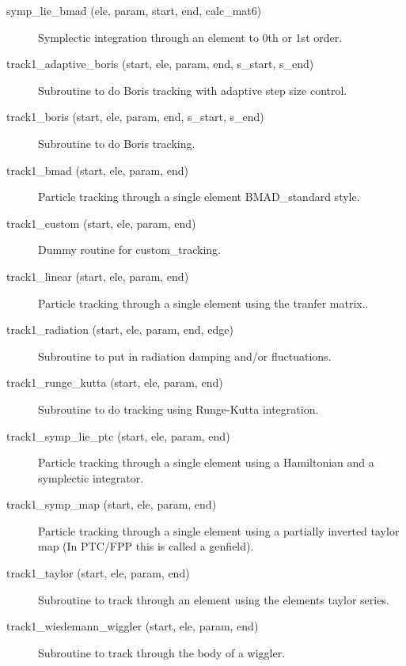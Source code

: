 \begin{description}

\item[symp\_lie\_bmad (ele, param, start, end, calc\_mat6)] \Newline
Symplectic integration through an element to 0th or 1st order.

\item[track1\_adaptive\_boris (start, ele, param, end, s\_start, s\_end)] \Newline
Subroutine to do Boris tracking with adaptive step size control. 

\item[track1\_boris (start, ele, param, end, s\_start, s\_end)] \Newline
Subroutine to do Boris tracking.  

\item[track1\_bmad (start, ele, param, end)] \Newline
Particle tracking through a single element BMAD\_standard style. 

\item[track1\_custom (start, ele, param, end)] \Newline
Dummy routine for custom\_tracking.

\item[track1\_linear (start, ele, param, end)] \Newline
Particle tracking through a single element using the tranfer matrix.. 

\item[track1\_radiation (start, ele, param, end, edge)] \Newline
Subroutine to put in radiation damping and/or fluctuations. 

\item[track1\_runge\_kutta (start, ele, param, end)] \Newline
Subroutine to do tracking using Runge-Kutta integration. 

\item[track1\_symp\_lie\_ptc (start, ele, param, end)] \Newline
Particle tracking through a single element using a Hamiltonian and a 
symplectic integrator. 

\item[track1\_symp\_map (start, ele, param, end)] \Newline
Particle tracking through a single element using a partially inverted 
taylor map (In PTC/FPP this is called a genfield). 

\item[track1\_taylor (start, ele, param, end)] \Newline
Subroutine to track through an element using the elements taylor series. 

\item[track1\_wiedemann\_wiggler (start, ele, param, end)] \Newline
Subroutine to track through the body of a wiggler. 

\end{description}

